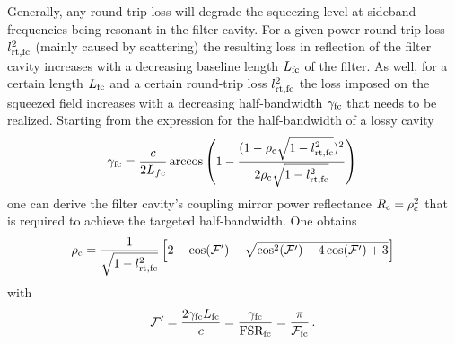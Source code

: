 Generally, any round-trip loss will degrade the squeezing level at
sideband frequencies being resonant in the filter cavity. For a
given power round-trip loss $l^2_{\rm rt,fc}$ (mainly caused by
scattering)  the resulting loss in reflection of the filter cavity
increases with a decreasing baseline length $L_{\rm fc}$ of the
filter. As well, for a certain length  $L_{\rm fc}$ and a certain
round-trip loss $l^2_{\rm rt,fc}$ the loss imposed on the squeezed
field increases with a decreasing half-bandwidth $\gamma_{\rm fc}$
that needs to be realized. Starting from the expression for the
half-bandwidth of a lossy cavity
\begin{equation} \gamma_{\rm fc} = \frac{c}{2 L_{fc}}
\arccos\left(1-\frac{(1-\rho_{\rm c}\sqrt{1- l^2_{\rm
rt,fc}})^2}{2\rho_{\rm c}\sqrt{1- l^2_{\rm
rt,fc}}}\right)\,\label{eq:gamma}
\end{equation}
one can derive the filter cavity's coupling mirror power reflectance
$R_{\rm c}=\rho_{\rm c}^2$ that is required to achieve the
targeted half-bandwidth. One obtains
\begin{equation}
\rho_{\rm c} = \frac{1}{\sqrt{1- l^2_{\rm
rt,fc}}}\left[2-\cos(\mathcal{F}^\prime) -
\sqrt{\cos^2(\mathcal{F}^\prime)-4 \cos(\mathcal{F}^\prime)+3}
\right]\label{eq:rc}
\end{equation}
with
\begin{equation}
\mathcal{F}^\prime =  \frac{2 \gamma_{\rm fc} L_{\rm fc}}{c} =
\frac{\gamma_{\rm fc}}{{\rm FSR_{fc}}}
=\frac{\pi}{\mathcal{F}_{\rm fc}}\,.
\end{equation}

